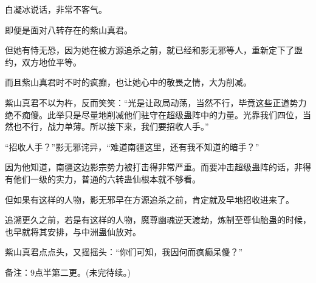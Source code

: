 \begin{this_body}
白凝冰说话，非常不客气。

即便是面对八转存在的紫山真君。

但她有恃无恐，因为她在被方源追杀之前，就已经和影无邪等人，重新定下了盟约，双方地位平等。

而且紫山真君时不时的疯癫，也让她心中的敬畏之情，大为削减。

紫山真君不以为杵，反而笑笑：“光是让政局动荡，当然不行，毕竟这些正道势力绝不痴傻。此举只是尽量地削减他们驻守在超级蛊阵中的力量。光靠我们四位，当然也不行，战力单薄。所以接下来，我们要招收人手。”

“招收人手？”影无邪诧异，“难道南疆这里，还有我不知道的暗手？”

因为他知道，南疆这边影宗势力被打击得非常严重。而要冲击超级蛊阵的话，非得有他们一级的实力，普通的六转蛊仙根本就不够看。

但如果有这样的人物，影无邪早在方源追杀之前，肯定就及早地招收进来了。

追溯更久之前，若是有这样的人物，魔尊幽魂逆天渡劫，炼制至尊仙胎蛊的时候，也早就将其安排，与中洲蛊仙放对。

紫山真君点点头，又摇摇头：“你们可知，我因何而疯癫呆傻？”

备注：9点半第二更。(未完待续。)

\end{this_body}

